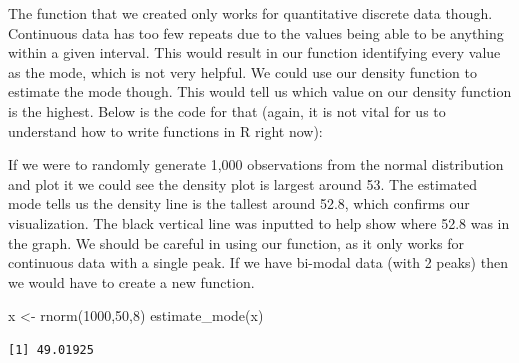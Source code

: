 \documentclass[
  letterpaper,
  DIV=11,
  numbers=noendperiod]{scrreprt}
\newenvironment{Shaded}{\begin{snugshade}}{\end{snugshade}}
\newcommand{\AttributeTok}[1]{\textcolor[rgb]{0.40,0.45,0.13}{#1}}
\newcommand{\ConstantTok}[1]{\textcolor[rgb]{0.56,0.35,0.01}{#1}}
\newcommand{\ControlFlowTok}[1]{\textcolor[rgb]{0.00,0.23,0.31}{\textbf{#1}}}
\newcommand{\DecValTok}[1]{\textcolor[rgb]{0.68,0.00,0.00}{#1}}
\newcommand{\FunctionTok}[1]{\textcolor[rgb]{0.28,0.35,0.67}{#1}}
\newcommand{\NormalTok}[1]{\textcolor[rgb]{0.00,0.23,0.31}{#1}}
\newcommand{\OtherTok}[1]{\textcolor[rgb]{0.00,0.23,0.31}{#1}}
\newcommand{\SpecialCharTok}[1]{\textcolor[rgb]{0.37,0.37,0.37}{#1}}
\begin{document}
The function that we created only works for quantitative discrete data
though. Continuous data has too few repeats due to the values being able
to be anything within a given interval. This would result in our
function identifying every value as the mode, which is not very helpful.
We could use our density function to estimate the mode though. This
would tell us which value on our density function is the highest. Below
is the code for that (again, it is not vital for us to understand how to
write functions in R right now):

\begin{Shaded}
\end{Shaded}

If we were to randomly generate 1,000 observations from the normal
distribution and plot it we could see the density plot is largest around
53. The estimated mode tells us the density line is the tallest around
52.8, which confirms our visualization. The black vertical line was
inputted to help show where 52.8 was in the graph. We should be careful
in using our function, as it only works for continuous data with a
single peak. If we have bi-modal data (with 2 peaks) then we would have
to create a new function.

\begin{Shaded}
\begin{Highlighting}[]
\NormalTok{x }\OtherTok{\textless{}{-}} \FunctionTok{rnorm}\NormalTok{(}\DecValTok{1000}\NormalTok{,}\DecValTok{50}\NormalTok{,}\DecValTok{8}\NormalTok{)}
\FunctionTok{estimate\_mode}\NormalTok{(x)}
\end{Highlighting}
\end{Shaded}

\begin{verbatim}
[1] 49.01925
\end{verbatim}
\end{document}
